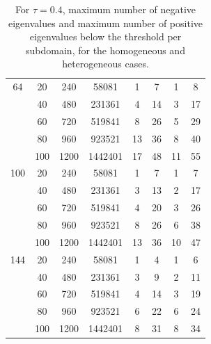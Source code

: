 \documentclass[numbers,webpdf,imaiai]{ima-authoring-template}%
\theoremstyle{thmstyletwo}%
\numberwithin{equation}{section}
\numberwithin{equation}{section}
\begin{document}
{\begin{table}[h!]
\begin{tabular}{cccc|cc|cc}
\hline
64 &  20 & 240 & 58081 & 1 & 7 & 1 & 8 \\
 &  40 & 480 & 231361 & 4 & 14 & 3 & 17 \\
 &  60 & 720 & 519841 & 8 & 26 & 5 & 29 \\
 &  80 & 960 & 923521 & 13 & 36 & 8 & 40 \\
 &  100 & 1200 & 1442401 & 17 & 48 & 11 & 55 \\
\hline
100 &  20 & 240 & 58081 & 1 & 7 & 1 & 7 \\
 &  40 & 480 & 231361 & 3 & 13 & 2 & 17 \\
 &  60 & 720 & 519841 & 4 & 20 & 3 & 26 \\
 &  80 & 960 & 923521 & 8 & 26 & 6 & 38 \\
 &  100 & 1200 & 1442401 & 13 & 36 & 10 & 47 \\
\hline
144 &  20 & 240 & 58081 & 1 & 4 & 1 & 6 \\
 &  40 & 480 & 231361 & 3 & 9 & 2 & 11 \\
 &  60 & 720 & 519841 & 4 & 14 & 3 & 19 \\
 &  80 & 960 & 923521 & 6 & 22 & 6 & 24 \\
 &  100 & 1200 & 1442401 & 8 & 31 & 8 & 34 \\
\hline
\end{tabular}
\caption{For \(\tau=0.4\), maximum number of negative eigenvalues and maximum number of positive eigenvalues 
below the threshold per subdomain, for the homogeneous and heterogeneous cases.}
\label{tab:4}
\end{table}

}
\end{document}
